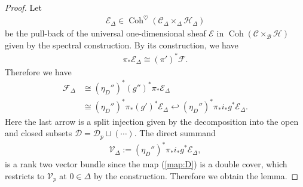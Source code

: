 \documentclass[11pt,oneside,a4paper,mathscr]{amsart}
\theoremstyle{definition}
\newcommand{\cH}{\mathcal{H}}
\newcommand{\cB}{\mathcal{B}}
\newcommand{\cC}{\mathcal{C}}
\newcommand{\cE}{\mathcal{E}}
\newcommand{\cF}{\mathcal{F}}
\newcommand{\cD}{\mathcal{D}}
\newcommand{\Coh}{\operatorname{Coh}}
\begin{document}
\begin{proof}
Let
\begin{align*}
  \cE_{\Delta} \in \Coh^{\heartsuit}(\cC_{\Delta} \times_{\Delta} \cH_{\Delta})
\end{align*}
be the pull-back of the universal one-dimensional sheaf $\cE$ in
$\Coh(\cC \times_{\cB} \cH)$ given by the spectral construction.
By its construction, we have
\begin{align*}
  \pi_*\cE_{\Delta} \cong (\pi')^*\cF.
\end{align*}
Therefore we have
\begin{align*}
  \cF_{\Delta}
  &\cong (\eta_D'')^*(g'')^*\pi_*\cE_{\Delta} \\
  &\cong (\eta_D'')^*\pi_* (g')^*\cE_{\Delta} \hookleftarrow
  (\eta_D'')^*\pi_{*} i_* g^* \cE_{\Delta}.
\end{align*}
Here the last arrow is a split injection given by the decomposition into the open and closed
subsets $\cD = \cD_p \sqcup (\cdots)$.
The direct summand 
\begin{align}\label{def:Vdelta}
  \mathcal{V}_{\Delta}
  :=
  (\eta_D'')^*\pi_{*} i_* g^*\cE_{\Delta},
\end{align}
is a rank two vector bundle since the map (\ref{map:D}) is a double 
cover, which restricts to $\mathcal{V}_p$ at $0\in \Delta$ by the construction. Therefore we obtain the lemma.
\end{proof}
\end{document}
